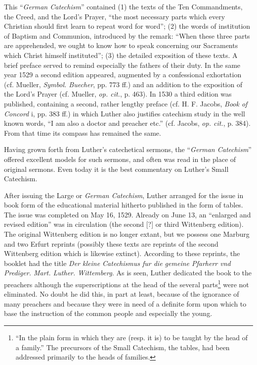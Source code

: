 This “\emph{German Catechism}” contained (1) the texts of the Ten Commandments, the Creed, and the Lord’s Prayer, “the most necessary parts which every Christian should first learn to repeat word for word”; (2) the words of institution of Baptism and Communion, introduced by the remark: “When these three parts are apprehended, we ought to know how to speak concerning our Sacraments which Christ himself instituted”; (3) the detailed exposition of these texts. A brief preface served to remind especially the fathers of their duty. In the same year 1529 a second edition appeared, augmented by a confessional exhortation (cf. Mueller, \emph{Symbol. Buecher}, pp. 773 ff.) and an addition to the exposition of the Lord’s Prayer (cf. Mueller, \emph{op. cit.}, p. 463). In 1530 a third edition was published, containing a second, rather lengthy preface (cf. H. F. Jacobs, \emph{Book of Concord} i, pp. 383 ff.) in which Luther also justifies catechism study in the well known words, “I am also a doctor and preacher etc.” (cf. Jacobs, \emph{op. cit.}, p. 384). From that time its compass has remained the same.

Having grown forth from Luther’s catechetical sermons, the “\emph{German Catechism}” offered excellent models for such sermons, and often was read in the place of original sermons. Even today it is the best commentary on Luther’s Small Catechism.

After issuing the Large or \emph{German Catechism}, Luther arranged for the issue in book form of the educational material hitherto published in the form of tables. The issue was completed on May 16, 1529. Already on June 13, an “enlarged and revised edition” was in circulation (the second [?] or third Wittenberg edition). The original Wittenberg edition is no longer extant, but we possess one Marburg and two Erfurt reprints (possibly these texts are reprints of the second Wittenberg edition which is likewise extinct). According
to these reprints, the booklet had the title \emph{Der kleine Catechismus fur die gemeine Pfarherr vnd Prediger. Mart. Luther. Wittemberg.} As is seen, Luther dedicated the book to the preachers although the superscriptions at the head of the several parts\footnote{“In the plain form in which they are (resp. it is) to be taught by the head of a family.” The precursors of the Small Catechism, the tables, had been addressed primarily to the heads of families.} were not eliminated. No doubt he did this, in part at least, because of the ignorance of many preachers and because they were in need of a definite form upon which to base the instruction of the common people and especially the young.

